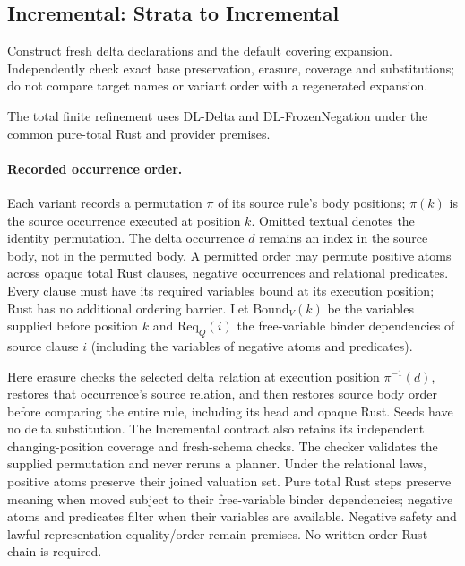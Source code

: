 \subsection{Incremental: Strata to Incremental}
Construct fresh delta declarations and the default covering expansion.
Independently check exact base preservation, erasure, coverage and substitutions;
do not compare target names or variant order with a regenerated expansion.
\begin{mathpar}
\end{mathpar}
The total finite refinement uses DL-Delta and DL-FrozenNegation under the common
pure-total Rust and provider premises.

\paragraph{Recorded occurrence order.}
Each variant records a permutation $\pi$ of its source rule's body positions;
$\pi(k)$ is the source occurrence executed at position $k$.  Omitted textual
 denotes the identity permutation.  The delta occurrence $d$ remains
an index in the source body, not in the permuted body. A permitted order may
permute positive atoms across opaque total Rust clauses, negative occurrences
and relational  predicates. Every clause must have its required
variables bound at its execution position; Rust has no additional ordering
barrier. Let $\mathrm{Bound}_V(k)$ be the variables supplied before position $k$
and $\mathrm{Req}_Q(i)$ the free-variable binder dependencies of source clause
$i$ (including the variables of negative atoms and  predicates).
\begin{mathpar}
\end{mathpar}
Here erasure checks the selected delta relation at execution position
$\pi^{-1}(d)$, restores that occurrence's source relation, and then restores
source body order before comparing the entire rule, including its head and
opaque Rust.  Seeds have no delta substitution.  The Incremental contract also
retains its independent changing-position coverage and fresh-schema checks.
The checker validates the supplied permutation and never reruns a planner.
Under the relational laws, positive atoms preserve their joined valuation set.
Pure total Rust steps preserve meaning when moved subject to their free-variable
binder dependencies; negative atoms and  predicates filter when
their variables are available. Negative safety and lawful representation
equality/order remain premises. No written-order Rust chain is required.

